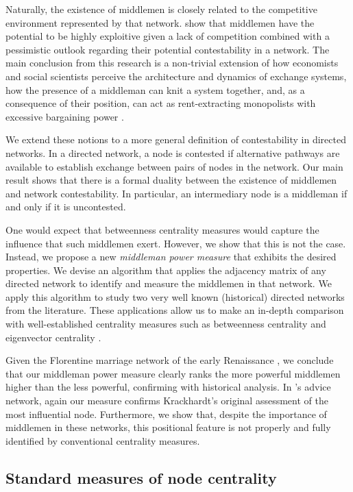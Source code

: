 \documentclass[11pt,fleqn]{article}
\begin{document}
Naturally, the existence of middlemen is closely related to the competitive environment represented by that network. \citet{GillesDiamantaris2013} show that middlemen have the potential to be highly exploitive given a lack of competition combined with a pessimistic outlook regarding their potential contestability in a network. The main conclusion from this research is a non-trivial extension of how economists and social scientists perceive the architecture and dynamics of exchange systems, how the presence of a middleman can knit a system together, and, as a consequence of their position, can act as rent-extracting monopolists with excessive bargaining power \citep[Chapter~11]{EasleyKleinberg2010}.

We extend these notions to a more general definition of contestability in directed networks. In a directed network, a node is contested if alternative pathways are available to establish exchange between pairs of nodes in the network. Our main result shows that there is a formal duality between the existence of middlemen and network contestability. In particular, an intermediary node is a middleman if and only if it is uncontested.

One would expect that betweenness centrality measures would capture the influence that such middlemen exert. However, we show that this is not the case. Instead, we propose a new \emph{middleman power measure} that exhibits the desired properties. We devise an algorithm that applies the adjacency matrix of any directed network to identify and measure the middlemen in that network. We apply this algorithm to study two very well known (historical) directed networks from the literature. These applications allow us to make an in-depth comparison with well-established centrality measures such as betweenness centrality and eigenvector centrality \citep{Bonacich1987}.

Given the Florentine marriage network of the early Renaissance \citep{Padgett1993, Padgett1994}, we conclude that our middleman power measure clearly ranks the more powerful middlemen higher than the less powerful, confirming with historical analysis.  In \citet{Krackhardt1987}'s advice network, again our measure confirms Krackhardt's original assessment of the most influential node. Furthermore, we show that, despite the importance of middlemen in these networks, this positional feature is not properly and fully identified by conventional centrality measures.

\subsection{Standard measures of node centrality}
\end{document}
